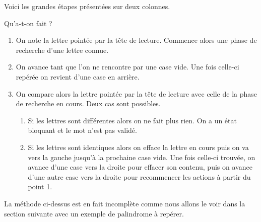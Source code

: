 Voici les grandes étapes présentées sur deux colonnes.




\vspace{-1em}


Qu'a-t-on fait ?
\begin{enumerate}
    \item On note la lettre pointée par la tête de lecture.
          Commence alors une phase de recherche d'une lettre connue.

    \item On avance tant que l'on ne rencontre par une case vide. Une fois celle-ci repérée on revient d'une case en arrière.

    \item On compare alors la lettre pointée par la tête de lecture avec celle de la phase de recherche en cours. Deux cas sont possibles.
    \begin{enumerate}
        \item Si les lettres sont différentes alors on ne fait plus rien.
              On a un état bloquant et le mot n'est pas validé.

        \item Si les lettres sont identiques alors on efface la lettre en cours puis on va vers la gauche jusqu'à la prochaine case vide.
              Une fois celle-ci trouvée, on avance d'une case vers la droite pour effacer son contenu, puis on avance d'une autre case vers la droite pour recommencer les actions à partir du point 1.
    \end{enumerate}
\end{enumerate}


La méthode ci-dessus est en fait incomplète comme nous allons le voir dans la section suivante avec un exemple de palindrome à repérer.
